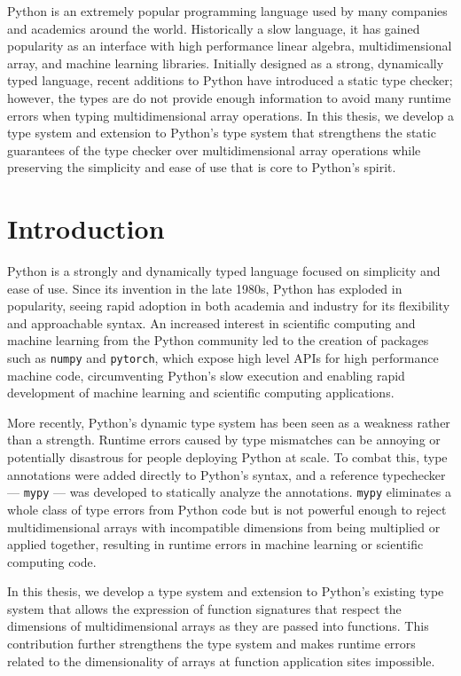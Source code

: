 \documentclass[12pt]{report}
\begin{document}
Python is an extremely popular programming language used by many companies and academics around the world. Historically a slow language, it has gained popularity as an interface with high performance linear algebra, multidimensional array, and machine learning libraries. Initially designed as a strong, dynamically typed language, recent additions to Python have introduced a static type checker; however, the types are do not provide enough information to avoid many runtime errors when typing multidimensional array operations. In this thesis, we develop a type system and extension to Python's type system that strengthens the static guarantees of the type checker over multidimensional array operations while preserving the simplicity and ease of use that is core to Python's spirit.

\tableofcontents

\chapter{Introduction}

Python is a strongly and dynamically typed language focused on simplicity and ease of use. Since its invention in the late 1980s, Python has exploded in popularity, seeing rapid adoption in both academia and industry for its flexibility and approachable syntax. An increased interest in scientific computing and machine learning from the Python community led to the creation of packages such as \texttt{numpy} and \texttt{pytorch}, which expose high level APIs for high performance machine code, circumventing Python's slow execution and enabling rapid development of machine learning and scientific computing applications.

More recently, Python's dynamic type system has been seen as a weakness rather than a strength. Runtime errors caused by type mismatches can be annoying or potentially disastrous for people deploying Python at scale. To combat this, type annotations were added directly to Python's syntax, and a reference typechecker --- \texttt{mypy} --- was developed to statically analyze the annotations. \texttt{mypy} eliminates a whole class of type errors from Python code but is not powerful enough to reject multidimensional arrays with incompatible dimensions from being multiplied or applied together, resulting in runtime errors in machine learning or scientific computing code.

In this thesis, we develop a type system and extension to Python's existing type system that allows the expression of function signatures that respect the dimensions of multidimensional arrays as they are passed into functions. This contribution further strengthens the type system and makes runtime errors related to the dimensionality of arrays at function application sites impossible.
\end{document}
